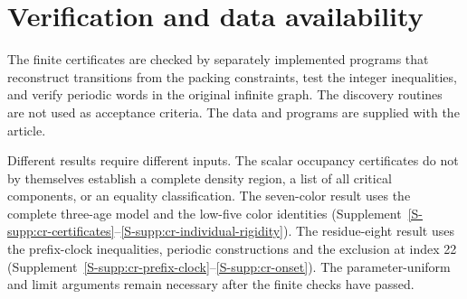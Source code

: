 \documentclass[11pt,reqno]{amsart}
\theoremstyle{plain}
\theoremstyle{plain}
\theoremstyle{plain}
\begin{document}

\section{Verification and data availability}\label{M-sec:repro}

The finite certificates are checked by separately implemented programs that
reconstruct transitions from the packing constraints, test the integer
inequalities, and verify periodic words in the original infinite graph.
The discovery routines are not used as acceptance criteria. The data and programs are supplied with the article.

Different results require different inputs. The scalar occupancy certificates
do not by themselves establish a complete density region, a list of all
critical components, or an equality classification. The seven-color result
uses the complete three-age model and the low-five color identities
(Supplement~\ref*{S-supp:cr-certificates}--\ref*{S-supp:cr-individual-rigidity}). The residue-eight result uses the prefix-clock
inequalities, periodic constructions and the exclusion at index 22
(Supplement~\ref*{S-supp:cr-prefix-clock}--\ref*{S-supp:cr-onset}). The parameter-uniform and limit arguments remain
necessary after the finite checks have passed.
\end{document}
